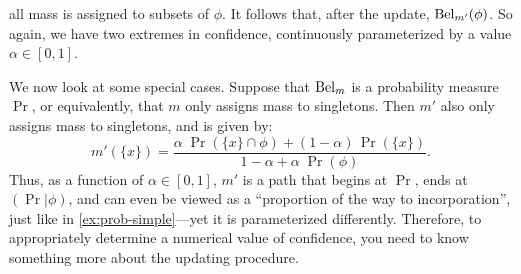 \begin{example}
all mass is assigned to subsets of $\phi$.
It follows that, after the update, $\mathrm{Bel}_{m'}(\phi)$.
So again, we have two extremes in confidence, continuously parameterized
by a value $\alpha \in [0,1]$.

We now look at some special cases. Suppose that $\mathrm{Bel}_m$ is a probability 
measure $\Pr$, or equivalently, that $m$ only assigns mass to singletons.
Then $m'$ also only assigns mass to singletons, and is given by:
\begin{equation}
m'(\{x\}) =
 \frac{\alpha\; \Pr(\{x\} \cap \phi) + (1-\alpha)\, \Pr(\{x\})}{1 - \alpha + \alpha\; \Pr(\phi)}.
 	\label{eq:ds-prob}
\end{equation}
Thus, as a function of $\alpha \in [0,1]$, $m'$ is  
a path that begins at $\Pr$,  ends at $(\Pr |\phi)$,
and can even be viewed as a ``proportion of the way to incorporation'',
just like in \cref{ex:prob-simple}---yet it is parameterized differently.
Therefore, to appropriately determine a numerical value of confidence, you need
to know something more about the updating procedure. 



\end{example}
